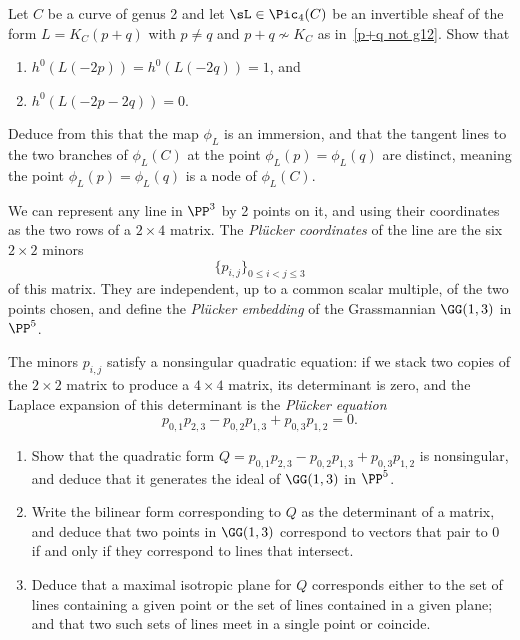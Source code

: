  
\begin{exercise}\label{nodal quartic}
Let $C$ be a  curve of genus 2 and let $\sL\in \Pic_4(C)$ be an invertible sheaf of the form $L = K_C(p+q)$ with $p \neq q$ and $p+q \not\sim K_C$ as in~\ref{p+q not g12}. Show that
\begin{enumerate}
\item $h^0(L(-2p)) = h^0(L(-2q)) = 1$, and
\item $h^0(L(-2p-2q)) = 0$.
\end{enumerate}
Deduce from this that the map $\phi_L$ is an immersion, and that the tangent lines to the two branches of $\phi_L(C)$ at the point $\phi_L(p) = \phi_L(q)$ are distinct, meaning the point $\phi_L(p) = \phi_L(q)$ is a node of $\phi_L(C)$.
\end{exercise}


 
 
\begin{exercise}\label{G13}
We can represent any line in $\PP^3$ by 2 points on it, and using their coordinates as the two rows of a 
$2\times 4$ matrix. The \emph{Pl\"ucker coordinates} of the line are the six $2\times 2$ minors
$$
\{p_{i,j}\}_{0\leq i<j\leq 3}
$$
of this matrix. They are independent, up to a common scalar multiple, of the two points chosen, and define the \emph{Pl\"ucker embedding} of the Grassmannian $\GG(1,3)$ in $\PP^5$.

The minors $p_{i,j}$  satisfy a nonsingular quadratic equation: if we stack two copies of the $2\times 2$
matrix to produce a $4\times 4$ matrix, its determinant is zero, and the Laplace expansion of this determinant
is the \emph{Pl\"ucker equation}
$$
p_{0,1}p_{2,3}-p_{0,2}p_{1,3}+p_{0,3}p_{1,2} = 0.
$$

\begin{enumerate}
\item Show that the quadratic form
$
Q = p_{0,1}p_{2,3}-p_{0,2}p_{1,3}+p_{0,3}p_{1,2}
$
is nonsingular, and deduce that it generates the ideal of $\GG(1,3)$ in $\PP^5$.
\item
Write the bilinear form corresponding to $Q$ as the determinant of a matrix, and deduce that 
two points in $\GG(1,3)$ correspond to vectors that pair to 0 if and only if they correspond to lines that intersect.
\item Deduce that a maximal isotropic plane for $Q$ corresponds either to the set of lines containing a given point or the set of lines contained in a given plane; and that two such sets of lines meet in a single point or coincide.
\end{enumerate}
\end{exercise}






